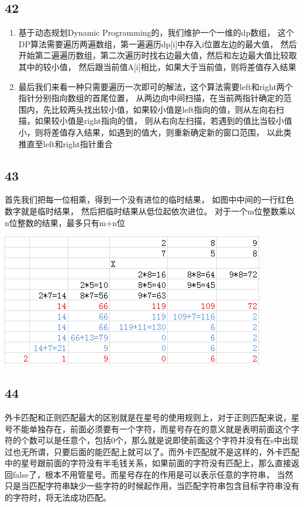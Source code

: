 \documentclass[12pt,a4paper]{article}
\begin{document}
\subsection{42}
\begin{enumerate}
\item
\begin{CJK}{UTF8}{gbsn}
基于动态规划Dynamic Programming的，我们维护一个一维的dp数组，
这个DP算法需要遍历两遍数组，第一遍遍历dp[i]中存入i位置左边的最大值，
然后开始第二遍遍历数组，第二次遍历时找右边最大值，然后和左边最大值比较取其中的较小值，
然后跟当前值A[i]相比，如果大于当前值，则将差值存入结果
\end{CJK}
\item
\begin{CJK}{UTF8}{gbsn}
最后我们来看一种只需要遍历一次即可的解法，这个算法需要left和right两个指针分别指向数组的首尾位置，
从两边向中间扫描，在当前两指针确定的范围内，先比较两头找出较小值，如果较小值是left指向的值，则从左向右扫描，如果较小值是right指向的值，
则从右向左扫描，若遇到的值比当较小值小，则将差值存入结果，如遇到的值大，则重新确定新的窗口范围，
以此类推直至left和right指针重合
\end{CJK}
\end{enumerate}

\subsection{43}
\begin{CJK}{UTF8}{gbsn}
首先我们把每一位相乘，得到一个没有进位的临时结果，
如图中中间的一行红色数字就是临时结果，
然后把临时结果从低位起依次进位。
对于一个m位整数乘以n位整数的结果，最多只有m+n位
\end{CJK}
\begin{center}
\includegraphics[width=0.8\linewidth]{0043.png}
\end{center}
\subsection{44}
\begin{CJK}{UTF8}{gbsn}
外卡匹配和正则匹配最大的区别就是在星号的使用规则上，对于正则匹配来说，星号不能单独存在，前面必须要有一个字符，而星号存在的意义就是表明前面这个字符的个数可以是任意个，包括0个，那么就是说即使前面这个字符并没有在s中出现过也无所谓，只要后面的能匹配上就可以了。而外卡匹配就不是这样的，外卡匹配中的星号跟前面的字符没有半毛钱关系，如果前面的字符没有匹配上，那么直接返回false了，根本不用管星号。而星号存在的作用是可以表示任意的字符串，
当然只是当匹配字符串缺少一些字符的时候起作用，当匹配字符串包含目标字符串没有的字符时，将无法成功匹配。
\end{CJK}
\end{document}
